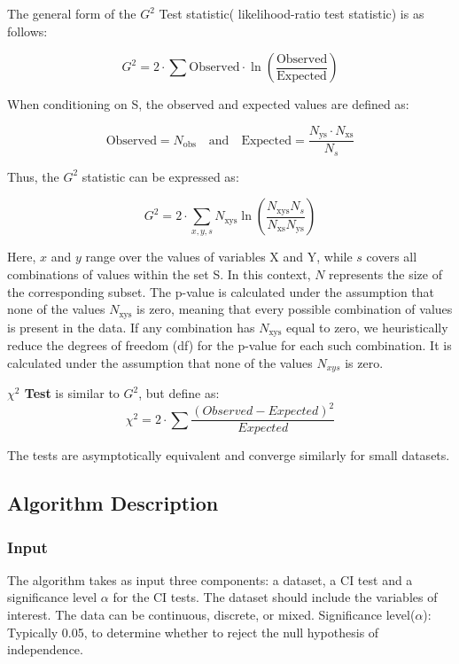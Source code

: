 \documentclass[main.tex]{subfiles}
\begin{document}
The general form of the $ G^2 $ Test statistic( likelihood-ratio test statistic) is as follows:

\[
G^2 = 2 \cdot \sum \text{Observed} \cdot \ln \left( \frac{\text{Observed}}{\text{Expected}} \right)
\]

When conditioning on S, the observed and expected values are defined as:

\[
\text{Observed} = N_{\text{obs}} \quad \text{and} \quad \text{Expected} = \frac{N_{\text{ys}} \cdot N_{\text{xs}}}{N_s}
\]

Thus, the $ G^2 $ statistic can be expressed as:

\[
G^2 = 2 \cdot \sum_{x,y,s} N_{\text{xys}} \ln \left( \frac{N_{\text{xys}} N_s}{N_{\text{xs}} N_{\text{ys}}} \right)
\]

Here, $ x $ and $ y $ range over the values of variables X and Y, while $ s $ covers all combinations of values within the set S. In this context, $ N $ represents the size of the corresponding subset. The p-value is calculated under the assumption that none of the values $ N_{\text{xys}} $ is zero, meaning that every possible combination of values is present in the data. If any combination has $ N_{\text{xys}} $ equal to zero, we heuristically reduce the degrees of freedom (df) for the p-value for each such combination. It is calculated under the assumption that none of the values $N_{xys}$ is zero\cite{Kitson2023}. 

\textbf{$ \chi^2 $ Test} is similar to $G^2$, but define as:
\[\chi ^2 = 2 \cdot \sum \frac{(Observed - Expected)^2}{Expected}\]

The tests are asymptotically equivalent and converge similarly for small datasets.

\subsection{Algorithm Description}
\subsubsection{Input}
The algorithm takes as input three components: a dataset, a CI test and a significance level $\alpha$ for the CI tests. The dataset should include the variables of interest. The data can be continuous, discrete, or mixed.
Significance level($\alpha$): Typically 0.05, to determine whether to reject the null hypothesis of independence.
\end{document}

